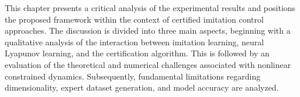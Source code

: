 This chapter presents a critical analysis of the experimental results and
positions the proposed framework within the context of certified imitation control approaches.
The discussion is divided into three main aspects, beginning with a qualitative analysis of the interaction 
between imitation learning, neural Lyapunov learning, and the certification algorithm.
This is followed by an evaluation of the theoretical and numerical challenges associated with nonlinear constrained dynamics. 
Subsequently, fundamental limitations regarding dimensionality, expert dataset generation, and model accuracy are analyzed.
